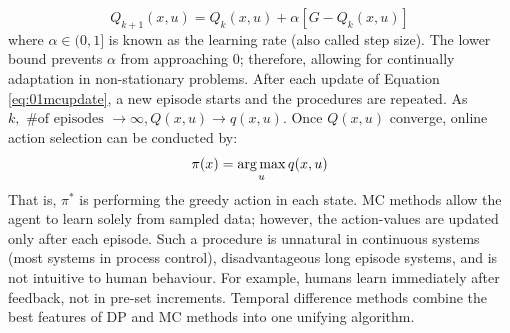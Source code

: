 \begin{equation}
        Q_{k+1}(x, u) = Q_{k}(x, u) + \alpha \left[G - Q_k(x, u) \right]
        \label{eq:01mcupdate}
\end{equation}
where $\alpha \in (0, 1]$ is known as the learning rate (also called step size). The lower bound prevents $\alpha$ from approaching 0; therefore, allowing for continually adaptation in non-stationary problems. After each update of Equation \ref{eq:01mcupdate}, a new episode starts and the procedures are repeated.  As $k, \text{ \# of episodes } \rightarrow \infty, Q(x, u) \rightarrow q(x, u)$. Once $Q(x, u)$ converge, online action selection can be conducted by:
\begin{equation}
    \pi(x) = \operatorname*{arg\,max}_{u} q(x, u)
    \label{eq:policy_extract}
\end{equation}
That is, $\pi^*$ is performing the greedy action in each state.  MC methods allow the agent to learn solely from sampled data; however, the action-values are updated only after each episode. Such a procedure is unnatural in continuous systems (most systems in process control), disadvantageous long episode systems, and is not intuitive to human behaviour. For example, humans learn immediately after feedback, not in pre-set increments. Temporal difference methods combine the best features of DP and MC methods into one unifying algorithm.





